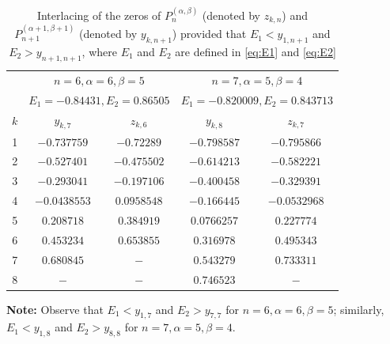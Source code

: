 \documentclass[final,3p,times,12pt]{elsarticle}
\numberwithin{equation}{section}  %
\begin{document}
	\begin{table}[H]
		\centering
		\caption{Interlacing of the zeros of $P_{n}^{(\alpha,\beta)}$ (denoted by $z_{k,n}$) and $P_{n+1}^{(\alpha+1,\beta+1)}$ (denoted by $y_{k,n+1}$) provided that  $E_1 < y_{1,n+1}$ and $E_2 > y_{n+1,n+1}$, where  $E_1$ and $E_2$ are defined in \eqref{eq:E1} and \eqref{eq:E2} }
		\label{tab1:Interlacingzeros_Jacobi}
		\footnotesize 
		\setlength{\tabcolsep}{12pt} 
		\begin{tabular}{@{}c cc | cc@{}}
			\toprule
			
			\addlinespace[2pt]
			& \multicolumn{2}{c|}{$n=6, \alpha=6, \beta=5$} & \multicolumn{2}{c}{$n=7, \alpha=5, \beta=4$} \\
			& \multicolumn{2}{c|}{$E_1 = -0.84431, E_2=0.86505$} & \multicolumn{2}{c}{$E_1=-0.820009, E_2=0.843713$} \\
			\midrule
			$k$ &  $y_{k,7}$ & $z_{k,6}$ & $y_{k,8}$ & $z_{k,7}$ \\
			\midrule
			1 &  $-0.737759$ & $-0.72289$ & $-0.798587$ &$-0.795866$ \\
			2 &  $-0.527401$ & $-0.475502$  & $-0.614213$ &$-0.582221$\\
			3 & $ -0.293041$ & $-0.197106$ & $-0.400458$ & $-0.329391$ \\
			4 & $-0.0438553$ & $ 0.0958548$  & $-0.166445$ & $-0.0532968$\\
			5 &  $ 0.208718$  &$0.384919$  & $ 0.0766257$  & $ 0.227774$ \\
			6 &  $ 0.453234$  &$0.653855$  & $0.316978$  & $0.495343$  \\
			7 &  $0.680845$  &$-$  & $	0.543279$  & $0.733311$ \\
			8&$-$&$-$&$0.746523$ &$-$\\
			\bottomrule
		\end{tabular}
		
		\vspace{0.2cm}
		\begin{minipage}{0.9\textwidth}
			\footnotesize
			\textbf{Note:} Observe that $E_1 < y_{1,7}$ and $E_2 > y_{7,7}$ for $n=6, \alpha=6, \beta=5$; similarly, $E_1 < y_{1,8}$ and $E_2 > y_{8,8}$ for $n=7, \alpha=5, \beta=4$.
		\end{minipage}
	\end{table}	
\end{document}
